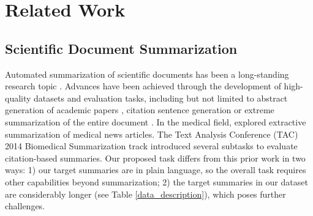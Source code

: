 \documentclass[letterpaper, table]{article} %
\begin{document}



\section{Related Work}
\subsection{Scientific Document Summarization}
Automated summarization of scientific documents has been a long-standing research topic \cite{Paice1980TheAG,teufel2002summarization}. Advances have been achieved through the development of high-quality datasets and evaluation tasks, including but not limited to abstract generation of academic papers \cite{Cohan2018ADA}, citation sentence generation \cite{Luu2020CitationTG} or extreme
summarization of the entire document \cite{Cachola2020TLDRES}. In the medical field, \citet{Sarkar2011UsingML} explored extractive summarization of medical news articles.
The Text Analysis Conference (TAC) 2014 Biomedical Summarization track introduced several subtasks to evaluate citation-based summaries.
Our proposed task differs from this prior work in two ways: 1) our target summaries are in plain language, so the overall task requires other capabilities beyond summarization;
2) the target summaries in our dataset are considerably longer (see Table \ref{data_description}), which poses further challenges.
\end{document}
